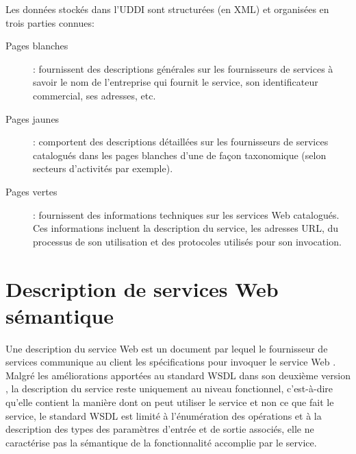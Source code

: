 
  Les données stockés dans l'\textsc{UDDI} sont structurées (en
  \textsc{XML}) et organisées en trois parties connues:

  \SpecialItem
  \begin{description}
    \item[Pages blanches]: fournissent des descriptions générales sur
      les fournisseurs de services à savoir le nom de l'entreprise qui
      fournit le service, son identificateur commercial, ses adresses,
      etc.

    \item[Pages jaunes]: comportent des descriptions détaillées sur
      les fournisseurs de services catalogués dans les pages blanches
      d'une de façon taxonomique (selon secteurs d'activités par
      exemple).

    \item[Pages vertes]: fournissent des informations techniques sur
      les services Web catalogués. Ces informations incluent la
      description du service, les adresses \textsc{URL}, du processus
      de son utilisation et des protocoles utilisés pour son
      invocation.
  \end{description}



\section{Description de services Web sémantique}
\label{sec:ws-description}


Une description du service Web est un document par lequel le
fournisseur de services communique au client les spécifications pour
invoquer le service Web \cite{lopez2008selection}. Malgré les
améliorations apportées au standard \textsc{WSDL} dans son deuxième
version \cite{chinnici2007web}, la description du service reste
uniquement au niveau fonctionnel, c'est-à-dire qu'elle contient la
manière dont on peut utiliser le service et non ce que fait le
service, le standard \textsc{WSDL} est limité à l'énumération des
opérations et à la description des types des paramètres d'entrée et de
sortie associés, elle ne caractérise pas la sémantique de la
fonctionnalité accomplie par le service.

